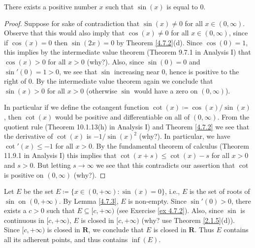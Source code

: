 \begin{lemma}\label{4.7.3}
    There exists a positive number \(x\) such that \(\sin(x)\) is equal to \(0\).
\end{lemma}

\begin{proof}
    Suppose for sake of contradiction that \(\sin(x) \neq 0\) for all \(x \in (0, \infty)\).
    Observe that this would also imply that \(\cos(x) \neq 0\) for all \(x \in (0, \infty)\), since if \(\cos(x) = 0\) then \(\sin(2x) = 0\) by Theorem \ref{4.7.2}(d).
    Since \(\cos(0) = 1\), this implies by the intermediate value theorem (Theorem 9.7.1 in Analysis I) that \(\cos(x) > 0\) for all \(x > 0\) (why?).
    Also, since \(\sin(0) = 0\) and \(\sin'(0) = 1 > 0\), we see that \(\sin\) increasing near \(0\), hence is positive to the right of \(0\).
    By the intermediate value theorem again we conclude that \(\sin(x) > 0\) for all \(x > 0\)
    (otherwise \(\sin\) would have a zero on \((0, \infty)\)).

    In particular if we define the cotangent function \(\cot(x) \coloneqq \cos(x) / \sin(x)\), then \(\cot(x)\) would be positive and differentiable on all of \((0, \infty)\).
    From the quotient rule (Theorem 10.1.13(h) in Analysis I) and Theorem \ref{4.7.2} we see that the derivative of \(\cot(x)\) is \(-1 / \sin(x)^2\) (why?).
    In particular, we have \(\cot'(x) \leq -1\) for all \(x > 0\).
    By the fundamental theorem of calculus (Theorem 11.9.1 in Analysis I) this implies that \(\cot(x + s) \leq \cot(x) - s\) for all \(x > 0\) and \(s > 0\).
    But letting \(s \to \infty\) we see that this contradicts our assertion that \(\cot\) is positive on \((0, \infty)\) (why?).
\end{proof}

\begin{note}
    Let \(E\) be the set \(E \coloneqq \{x \in (0, +\infty) : \sin(x) = 0\}\), i.e., \(E\) is the set of roots of \(\sin\) on \((0, +\infty)\).
    By Lemma \ref{4.7.3}, \(E\) is non-empty.
    Since \(\sin'(0) > 0\), there exists a \(c > 0\) such that \(E \subseteq [c, +\infty)\) (see Exercise \ref{ex 4.7.2}).
    Also, since \(\sin\) is continuous in \([c, +\infty)\), \(E\) is closed in \([c, +\infty)\) (why? use Theorem \ref{2.1.5}(d)).
    Since \([c, +\infty)\) is closed in \(\mathbf{R}\), we conclude that \(E\) is closed in \(\mathbf{R}\).
    Thus \(E\) contains all its adherent points, and thus contains \(\inf(E)\).
\end{note}

